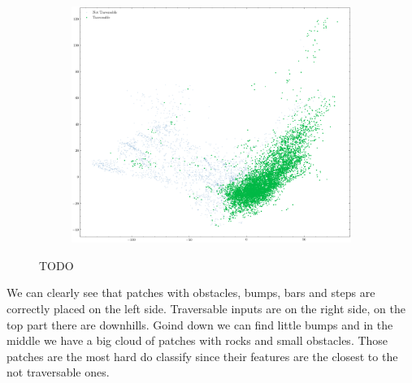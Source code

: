 \documentclass[../document.tex]{subfiles}
\begin{document}
\begin{figure}[H]
\begin{subfigure}[b]{0.48\textwidth}
        \includegraphics[width=\linewidth]{../img/5/pca/pca-test-1.png}
    \end{subfigure}
\caption{TODO}
\end{figure}

We can clearly see that patches with obstacles, bumps, bars and steps are correctly placed on the left side. Traversable inputs are on the right side, on the top part there are downhills. Goind down we can find little bumps and in the middle we have a big cloud of patches with rocks and small obstacles. Those patches are the most hard do classify since their features are the closest to the not traversable ones. 
 
% 
% 
\end{document}
